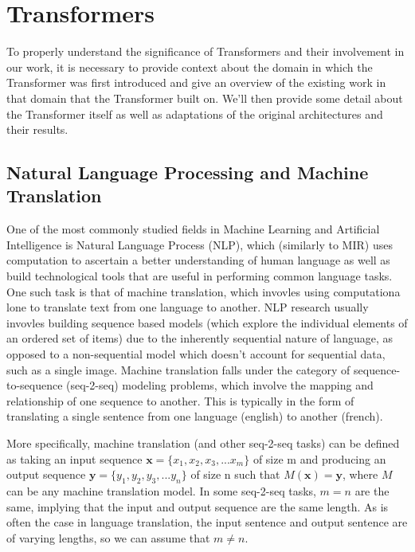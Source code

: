 \section{Transformers}
To properly understand the significance of Transformers and their involvement in our work, it is necessary to provide context about the domain in which the Transformer was first introduced and give an overview of the existing work in that domain that the Transformer built on. We'll then provide some detail about the Transformer itself as well as adaptations of the original architectures and their results. 

\subsection{Natural Language Processing and Machine Translation}
One of the most commonly studied fields in Machine Learning and Artificial Intelligence is Natural Language Process (NLP), which (similarly to MIR) uses computation to ascertain a better understanding of human language as well as build technological tools that are useful in performing common language tasks. One such task is that of machine translation, which invovles using computationa lone to translate text from one language to another. NLP research usually invovles building sequence based models (which explore the individual elements of an ordered set of items) due to the inherently sequential nature of language, as opposed to a non-sequential model which doesn't account for sequential data, such as a single image. Machine translation falls under the category of sequence-to-sequence (seq-2-seq) modeling problems, which involve the mapping and relationship of one sequence to another. This is typically in the form of translating a single sentence from one language (english) to another (french).

\newcommand{\mb}[1]{\mathbf{#1}}

More specifically, machine translation (and other seq-2-seq tasks) can be defined as taking an input sequence $\mb{x} = \{x_1, x_2, x_3,...x_m\}$ of size m and producing an output sequence $\mb{y} = \{y_1, y_2, y_3, ... y_n\}$ of size n such that $M(\mb{x}) = \mb{y}$, where $M$ can be any machine translation model. In some seq-2-seq tasks, $m = n$ are the same, implying that the input and output sequence are the same length. As is often the case in language translation, the input sentence and output sentence are of varying lengths, so we can assume that $m \neq n$. 

